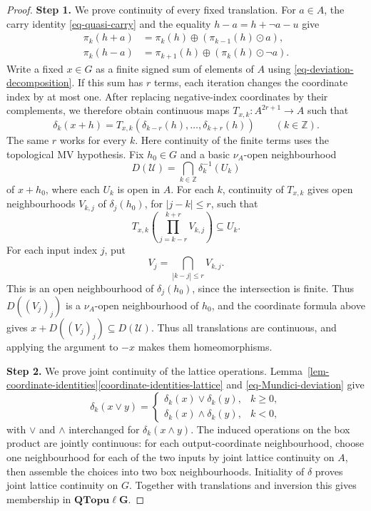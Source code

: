 \documentclass[preprint,3p]{elsarticle}
\theoremstyle{plain}
\theoremstyle{definition}
\newcommand{\QTopulg}{\mathbf{QTopu\ell G}}
\numberwithin{equation}{section}
\begin{document}
\begin{proof}
\textbf{Step 1.} We prove continuity of every fixed translation.
For $a\in A$, the carry identity
\eqref{eq-quasi-carry} and the equality $h-a=h+\neg a-u$ give
\[
 \begin{aligned}
 \pi_k(h+a)&=\pi_k(h)\oplus(\pi_{k-1}(h)\odot a),\\
 \pi_k(h-a)&=\pi_{k+1}(h)\oplus(\pi_k(h)\odot\neg a).
 \end{aligned}
\]
Write a fixed $x\in G$ as a finite signed sum of elements of $A$
using \eqref{eq-deviation-decomposition}.
If this sum has $r$ terms, each iteration changes the coordinate
index by at most one.  After replacing negative-index coordinates
by their complements, we therefore obtain continuous maps
$T_{x,k}\colon A^{2r+1}\longrightarrow A$ such that
\[
 \delta_k(x+h)=T_{x,k}
   (\delta_{k-r}(h),\ldots,\delta_{k+r}(h))
 \qquad(k\in\mathbb Z).
\]
The same $r$ works for every $k$.
Here continuity of the finite terms uses the topological MV hypothesis.
Fix $h_0\in G$ and a basic $\nu_A$-open neighbourhood
\[
 D(\mathcal U)=\bigcap_{k\in\mathbb Z}\delta_k^{-1}(U_k)
\]
of $x+h_0$, where each $U_k$ is open in $A$.
For each $k$, continuity of $T_{x,k}$ gives open neighbourhoods
$V_{k,j}$ of $\delta_j(h_0)$, for $|j-k|\leq r$, such that
\[
 T_{x,k}\left(\prod_{j=k-r}^{k+r}V_{k,j}\right)\subseteq U_k.
\]
For each input index $j$, put
\[
 V_j=\bigcap_{|k-j|\leq r}V_{k,j}.
\]
This is an open neighbourhood of $\delta_j(h_0)$, since the
intersection is finite.  Thus $D((V_j)_j)$ is a
$\nu_A$-open neighbourhood of $h_0$, and the coordinate
formula above gives $x+D((V_j)_j)\subseteq D(\mathcal U)$.
Thus all translations are continuous, and applying the argument to
$-x$ makes them homeomorphisms.

\textbf{Step 2.} We prove joint continuity of the lattice operations.
Lemma~\ref{lem-coordinate-identities}\ref{coordinate-identities-lattice}
and \eqref{eq-Mundici-deviation} give
\[
 \delta_k(x\vee y)=
 \begin{cases}
  \delta_k(x)\vee\delta_k(y),&k\geq0,\\
  \delta_k(x)\wedge\delta_k(y),&k<0,
 \end{cases}
\]
with $\vee$ and $\wedge$ interchanged for $\delta_k(x\wedge y)$.
The induced operations on the box product are jointly continuous:
for each output-coordinate neighbourhood, choose one neighbourhood
for each of the two inputs by joint lattice continuity on $A$, then
assemble the choices into two box neighbourhoods.
Initiality of $\delta$ proves joint lattice continuity on $G$.
Together with translations and inversion this gives membership in
$\QTopulg$.


\end{proof}
\end{document}
